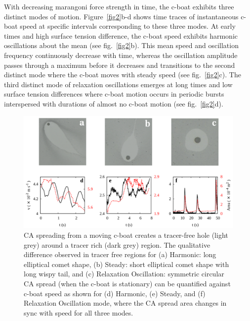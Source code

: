 \documentclass[journal=langd5, manuscript=article, layout=twocolumn]{achemso}
\begin{document}
With decreasing marangoni force strength in time, the c-boat exhibits three distinct modes of motion.  Figure~\ref{fig2}b-d shows time traces of instantaneous c-boat speed at specific intervals corresponding to these three modes. At early times and high surface tension difference, the c-boat speed exhibits harmonic oscillations about the mean (see fig.~\ref{fig2}b). This mean speed and oscillation frequency continuously decrease with time, whereas the oscillation amplitude passes through a maximum before it decreases and transitions to the second distinct mode where the c-boat moves with steady speed (see fig.~\ref{fig2}c). The third distinct mode of relaxation oscillations emerges at long times and low surface tension differences where c-boat motion occurs in periodic bursts interspersed with durations of almost no c-boat motion (see fig.~\ref{fig2}d).

\begin{figure}[ht] 
    \centering
       \includegraphics[width=\textwidth]{figure3_v2.pdf}
    \caption{CA spreading from a moving c-boat creates a tracer-free hole (light grey) around a tracer rich (dark grey) region. The qualitative difference observed in tracer free regions for (a) Harmonic: long elliptical comet shape, (b) Steady: short elliptical comet shape with long wispy tail, and (c) Relaxation Oscillation: symmetric circular CA spread (when the c-boat is stationary) can be quantified against c-boat speed as shown for (d) Harmonic, (e) Steady, and (f) Relaxation Oscillation mode, where the CA spread area changes in sync with speed for all three modes. }
    \label{fig3}
\end{figure}
\end{document}
